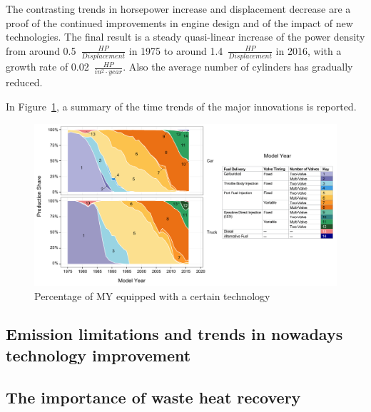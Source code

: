 \documentclass[12pt]{report}   %
\begin{document}
The contrasting trends in horsepower increase and displacement decrease are a proof of the continued improvements in engine design and of the impact of new technologies. The final result is a steady quasi-linear increase of the power density from around 0.5~$\frac{HP}{Displacement}$ in 1975 to around 1.4~$\frac{HP}{Displacement}$ in 2016, with a growth rate of 0.02~$\frac{HP}{in^{2} \cdot year}$. Also the average number of cylinders has gradually reduced.

In Figure~\ref{fig:technology_trends}, a summary of the time trends of the major innovations is reported.

\begin{figure}[ht]
  \centering  \includegraphics[width=\textwidth]{figures/review/technology_trends.png}
  \caption{Percentage of MY equipped with a certain technology  \label{fig:technology_trends} }
\end{figure}


\subsection{Emission limitations and trends in nowadays technology improvement}
\label{sec:technology_improvements}

\subsection{The importance of waste heat recovery}





\end{document}
